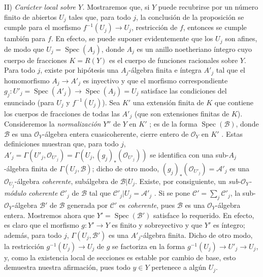 II) \emph{Carácter local sobre $Y$.}
Mostraremos que, si $Y$ puede recubrirse por un número finito de abiertos $U_j$ tales que, para todo $j$, la conclusión de la proposición se cumple para el morfismo $f^{-1}(U_j)\to U_j$, restricción de $f$, entonces se cumple también para $f$.
En efecto, se puede suponer evidentemente que los $U_j$ son afines, de modo que $U_j=\operatorname{Spec}(A_j)$, donde $A_j$ es un anillo noetheriano íntegro cuyo cuerpo de fracciones $K=R(Y)$ es el cuerpo de funciones racionales sobre $Y$.
Para todo $j$, existe por hipótesis una $A_j$-álgebra finita e íntegra $A'_j$ tal que el homomorfismo $A_j\to A'_j$ es inyectivo  y que el morfismo correspondiente $g_j:U'_j=\operatorname{Spec}(A'_j)\to\operatorname{Spec}(A_j)=U_j$ satisface las condiciones del enunciado (para $U_j$ y $f^{-1}(U_j)$).
Sea $K'$ una extensión finita de $K$ que contiene los cuerpos de fracciones de todas las $A'_j$ (que son extensiones finitas de $K$).
Consideremos la \emph{normalización} $Y''$ de $Y$ en $K'$ ; es de la forma $\operatorname{Spec}(\mathcal B)$, donde $\mathcal B$ es una $\mathcal O_Y$-álgebra entera cuasicoherente, cierre entero de $\mathcal O_Y$ en $K'$ .
Estas definiciones muestran que, para todo $j$,
$A'_j=\Gamma(U'_j,\mathcal O_{U'_j})
=\Gamma(U_j,(g_j)_*(\mathcal O_{U'_j}))$
se identifica con una sub-$A_j$-álgebra finita de $\Gamma(U_j,\mathcal B)$; dicho de otro modo,
$(g_j)_*(\mathcal O_{U'_j})=\mathcal A'_j$
es una $\mathcal O_{U_j}$-álgebra \emph{coherente}, subálgebra de $\mathcal B|U_j$.
Existe, por consiguiente, un \emph{sub-$\mathcal O_Y$-módulo coherente $\mathcal C'_j$} de $\mathcal B$ tal que $\mathcal C'_j|U_j=\mathcal A'_j$ .
Si se pone $\mathcal C'=\sum_j\mathcal C'_j$, la sub-$\mathcal O_Y$-álgebra $\mathcal B'$ de $\mathcal B$ generada por $\mathcal C'$ es \emph{coherente}, pues $\mathcal B$ es una $\mathcal O_Y$-álgebra entera.
Mostremos ahora que $Y'=\operatorname{Spec}(\mathcal B')$ satisface lo requerido.
En efecto, es claro que el morfismo $g:Y'\to Y$ es finito y sobreyectivo y que $Y'$ es íntegro; además, para todo $j$, $\Gamma(U_j,\mathcal B')$ es una $A'_j$-álgebra finita.
Dicho de otro modo, la restricción $g^{-1}(U_j)\to U_j$ de $g$ se factoriza en la forma
$g^{-1}(U_j)\to U'_j\to U_j$,
y, como la existencia local de secciones es estable por cambio de base, esto demuestra nuestra afirmación, pues todo $y\in Y$ pertenece a algún $U_j$.

